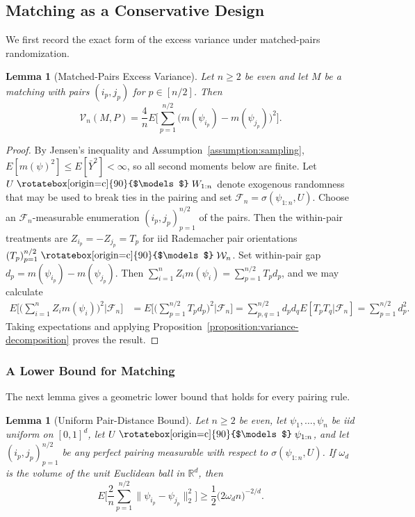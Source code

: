 \documentclass[letterpaper,12pt]{article}
\newtheorem{lem}[thm]{Lemma}
\theoremstyle{definition}
\numberwithin{equation}{section}
\newcommand{\mc}{\mathcal}
\newcommand{\ylevel}{\bar Y}
\newcommand{\indep}{\mathrel{\raisebox{0.05em}{\rotatebox[origin=c]{90}{$\models$}}}}
\begin{document}
\subsection{Matching as a Conservative Design}\label{appendix:proofs-matching}

We first record the exact form of the excess variance under matched-pairs randomization.

\begin{lem}[Matched-Pairs Excess Variance]\label{lemma:proof-matched-pairs-excess}
Let $n\geq2$ be even and let $M$ be a matching with pairs $(i_p,j_p)$ for $p\in[n/2]$.
Then
\begin{equation}
\mc V_n(M,P)=\frac{4}{n}E\bigg[\sum_{p=1}^{n/2}\bigg(m(\psi_{i_p})-m(\psi_{j_p})\bigg)^2\bigg].
\end{equation}
\end{lem}

\begin{proof}
By Jensen's inequality and Assumption~\ref{assumption:sampling}, $E[m(\psi)^2] \leq E[\ylevel^2] <\infty$, so all second moments below are finite.
Let $U\indep W_{1:n}$ denote exogenous randomness that may be used to break ties in the pairing and set $\mathcal F_n=\sigma(\psi_{1:n},U)$.
Choose an $\mathcal F_n$-measurable enumeration $(i_p,j_p)_{p=1}^{n/2}$ of the pairs.
Then the within-pair treatments are $Z_{i_p}=-Z_{j_p} = T_p$ for iid Rademacher pair orientations $(T_p)_{p=1}^{n/2} \indep \mc W_n$.
Set within-pair gap $d_p=m(\psi_{i_p})-m(\psi_{j_p})$.
Then $\sum_{i=1}^nZ_im(\psi_i)=\sum_{p=1}^{n/2}T_pd_p$, and we may calculate
\begin{align*}
E\bigg[\bigg(\sum_{i=1}^nZ_im(\psi_i)\bigg)^2\bigg|\mathcal F_n\bigg]&=E\bigg[\bigg(\sum_{p=1}^{n/2}T_pd_p\bigg)^2\bigg|\mathcal F_n\bigg] =\sum_{p,q=1}^{n/2}d_pd_qE[T_pT_q|\mathcal F_n]=\sum_{p=1}^{n/2}d_p^2.
\end{align*}
Taking expectations and applying Proposition~\ref{proposition:variance-decomposition} proves the result.
\end{proof}

\subsubsection{A Lower Bound for Matching}

The next lemma gives a geometric lower bound that holds for every pairing rule.

\begin{lem}[Uniform Pair-Distance Bound]\label{lemma:proof-uniform-pair-distance}
Let $n\geq2$ be even, let $\psi_1,\ldots,\psi_n$ be iid uniform on $[0,1]^d$, let $U\indep\psi_{1:n}$, and let $(i_p,j_p)_{p=1}^{n/2}$ be any perfect pairing measurable with respect to $\sigma(\psi_{1:n},U)$.
If $\omega_d$ is the volume of the unit Euclidean ball in $\mathbb R^d$, then
\begin{equation}\label{equation:proof-uniform-pair-distance}
E\bigg[\frac{2}{n}\sum_{p=1}^{n/2}\|\psi_{i_p}-\psi_{j_p}\|_2^2\bigg]\geq\frac12\bigg(2\omega_dn\bigg)^{-2/d}.
\end{equation}
\end{lem}
\end{document}
